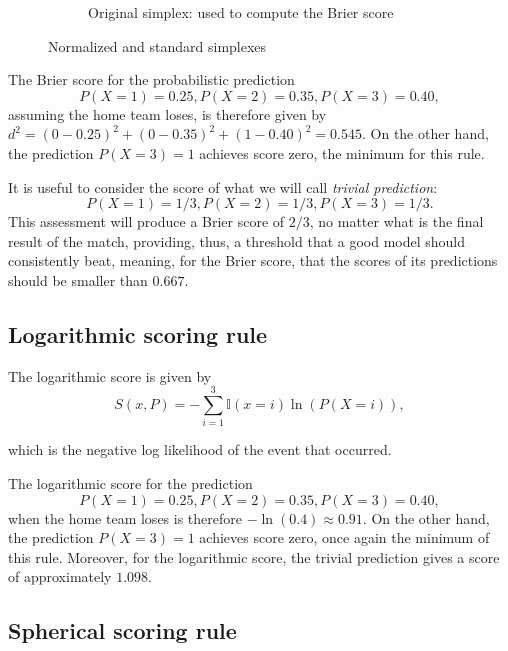 \documentclass[journal,article,accept,moreauthors,pdftex,12pt,a4paper]{mdpi}
\begin{document}
\begin{figure}[!ht]
\begin{subfigure}[b]{0.48\linewidth}
			
			
			\caption{Original simplex: used to compute the Brier score}
			\label{fig:B}
		\end{subfigure}
		\caption{Normalized and standard simplexes}
		\label{fig:norm_stand}
	\end{figure}
	
	The Brier score for the probabilistic prediction
	$$P(X=1)=0.25, P(X=2)=0.35, P(X=3)=0.40,$$ 
	assuming the home team loses, is therefore given by $d^2=(0-0.25)^2+(0-0.35)^2+(1-0.40)^2=0.545$. 
	On the other hand, the prediction $P(X=3)=1$ achieves score  zero, the minimum for this rule.
	
	It is useful to consider the score of what we will call {\it trivial prediction}:
	$$P(X=1)=1/3, P(X=2)=1/3, P(X=3)=1/3.$$
	This assessment will produce a Brier score of $2/3$, no matter what is the final result of the match, providing, thus, a threshold that a good model should consistently beat, meaning, for the Brier score, that the scores of its predictions should be smaller than $0.667$.  
	
	
	
	\subsection{Logarithmic scoring rule}
	
	The logarithmic  score is given by
	$$S(x,P)=- \sum_{i=1}^3\mathbb{I}(x=i)\ln(P(X=i)),$$
	
	\noindent
	which is the negative log likelihood of the event that occurred.
	
	The logarithmic score for the prediction 
		$$P(X=1)=0.25, P(X=2)=0.35, P(X=3)=0.40,$$ 
		 when the home team loses is therefore 
	$-\ln(0.4)\approx 0.91$. 
	On the other hand, the prediction $P(X=3)=1$ achieves score zero, once again the minimum of this rule.
	Moreover, for the logarithmic score, the trivial prediction gives a score of approximately $1.098$.
	
	\subsection{Spherical scoring rule}
	
\end{document}
